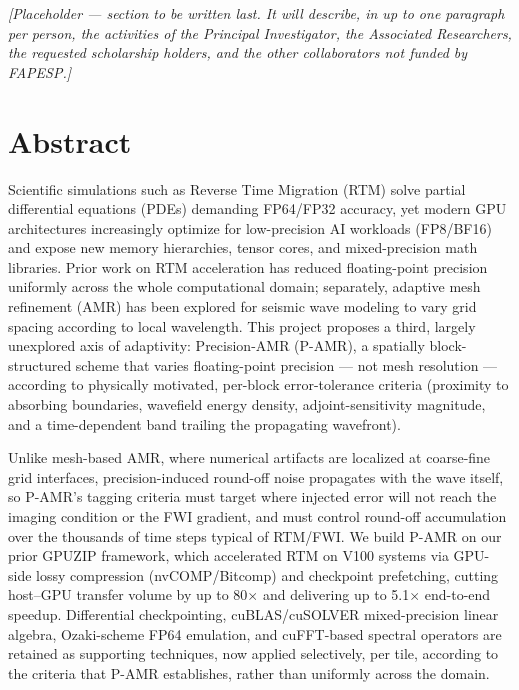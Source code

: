 \documentclass[12pt,a4paper]{article}
\newcommand{\pamr}{P\nobreakdash-AMR}
\begin{document}
\emph{[Placeholder --- section to be written last. It will describe, in up
to one paragraph per person, the activities of the Principal Investigator,
the Associated Researchers, the requested scholarship holders, and the
other collaborators not funded by FAPESP.]}

\iffalse

\section*{Abstract}

Scientific simulations such as Reverse Time Migration (RTM) solve partial
differential equations (PDEs) demanding FP64/FP32 accuracy, yet modern GPU
architectures increasingly optimize for low-precision AI workloads (FP8/BF16)
and expose new memory hierarchies, tensor cores, and mixed-precision math
libraries. Prior work on RTM acceleration has reduced floating-point precision
uniformly across the whole computational domain; separately, adaptive mesh
refinement (AMR) has been explored for seismic wave modeling to vary grid
spacing according to local wavelength. This project proposes a third, largely
unexplored axis of adaptivity: Precision-AMR (\pamr{}), a spatially
block-structured scheme that varies floating-point precision --- not mesh
resolution --- according to physically motivated, per-block error-tolerance
criteria (proximity to absorbing boundaries, wavefield energy density,
adjoint-sensitivity magnitude, and a time-dependent band trailing the
propagating wavefront).

Unlike mesh-based AMR, where numerical artifacts are localized at coarse-fine
grid interfaces, precision-induced round-off noise propagates with the wave
itself, so \pamr{}'s tagging criteria must target where injected error will not
reach the imaging condition or the FWI gradient, and must control round-off
accumulation over the thousands of time steps typical of RTM/FWI. We build
\pamr{} on our prior GPUZIP framework, which accelerated RTM on V100 systems
via GPU-side lossy compression (nvCOMP/Bitcomp) and checkpoint prefetching,
cutting host--GPU transfer volume by up to 80$\times$ and delivering up to
5.1$\times$ end-to-end speedup. Differential checkpointing, cuBLAS/cuSOLVER
mixed-precision linear algebra, Ozaki-scheme FP64 emulation, and cuFFT-based
spectral operators are retained as supporting techniques, now applied
selectively, per tile, according to the criteria that \pamr{} establishes,
rather than uniformly across the domain.
\end{document}
